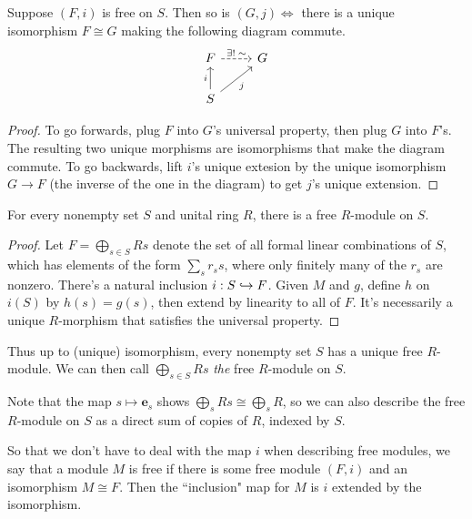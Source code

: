 \documentclass[twoside,10pt]{report}
\begin{document}
\begin{thrm}[Uniqueness]
	\label{thrm:free-unique}
	Suppose $(F,i)$ is free on $S$. Then so is $(G,j) \iff$ there is a unique isomorphism $F \cong G$ making the following diagram commute.
	\[
	\begin{tikzcd}
		F \rar[dashed]{\exists!\;\sim} & G \\
		S \uar{i}\arrow[ur,"j"']
	\end{tikzcd}
	\] 
\end{thrm}
\begin{proof}
	To go forwards, plug $F$ into $G$'s universal property, then plug $G$ into $F$'s. The resulting two unique morphisms are isomorphisms that make the diagram commute. To go backwards, lift $i$'s unique extesion by the unique isomorphism $G\to F$ (the inverse of the one in the diagram) to get $j$'s unique extension.
\end{proof}

\begin{thrm}[Existence]
	For every nonempty set $S$ and unital ring $R$, there is a free $R$-module on $S$.
\end{thrm}
\begin{proof}
	Let $F = \bigoplus_{s \in S}Rs$ denote the set of all formal linear combinations of $S$, which has elements of the form $\sum_s r_s s$, where only finitely many of the $r_s$ are nonzero. There's a natural inclusion $i: S \hookrightarrow F$. Given $M$ and $g$, define $h$ on $i(S)$ by $h(s) = g(s)$, then extend by linearity to all of $F$. It's necessarily a unique $R$-morphism that satisfies the universal property.
\end{proof}

\begin{note}[]
	Thus up to (unique) isomorphism, every nonempty set $S$ has a unique free $R$-module. We can then call $\bigoplus_{s \in S}Rs$ \textit{the} free $R$-module on $S$.
\end{note}

Note that the map $s \mapsto \mathbf{e}_{s}$ shows $\bigoplus_{s}Rs \cong \bigoplus_{s}R$, so we can also describe the free $R$-module on $S$ as a direct sum of copies of $R$, indexed by $S$.

So that we don't have to deal with the map $i$ when describing free modules, we say that a module $M$ is free if there is some free module $(F,i)$ and an isomorphism $M \cong F$. Then the ``inclusion" map for $M$ is $i$ extended by the isomorphism.

\end{document}
